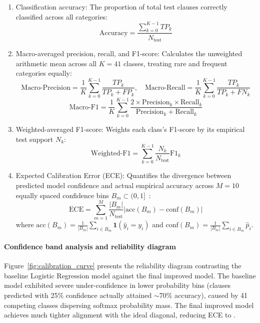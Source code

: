 \begin{enumerate}
    \item Classification accuracy: The proportion of total test clauses correctly classified across all categories:
    \begin{equation}
        \text{Accuracy} = \frac{\sum_{k=0}^{K-1} TP_k}{N_{\text{test}}}
        \label{eq:accuracy}
    \end{equation}
    
    \item Macro-averaged precision, recall, and F1-score: Calculates the unweighted arithmetic mean across all $K = 41$ classes, treating rare and frequent categories equally:
    \begin{equation}
        \text{Macro-Precision} = \frac{1}{K} \sum_{k=0}^{K-1} \frac{TP_k}{TP_k + FP_k}, \quad
        \text{Macro-Recall} = \frac{1}{K} \sum_{k=0}^{K-1} \frac{TP_k}{TP_k + FN_k}
        \label{eq:macro_pr}
    \end{equation}
    \begin{equation}
        \text{Macro-F1} = \frac{1}{K} \sum_{k=0}^{K-1} \frac{2 \times \text{Precision}_k \times \text{Recall}_k}{\text{Precision}_k + \text{Recall}_k}
        \label{eq:macro_f1}
    \end{equation}

    \item Weighted-averaged F1-score: Weights each class's F1-score by its empirical test support $N_k$:
    \begin{equation}
        \text{Weighted-F1} = \sum_{k=0}^{K-1} \frac{N_k}{N_{\text{test}}} \text{F1}_k
        \label{eq:weighted_f1}
    \end{equation}

    \item Expected Calibration Error (ECE): Quantifies the divergence between predicted model confidence and actual empirical accuracy across $M = 10$ equally spaced confidence bins $B_m \subset (0, 1]$~\cite{guo2017calibration}:
    \begin{equation}
        \text{ECE} = \sum_{m=1}^{M} \frac{|B_m|}{N_{\text{test}}} \big|\text{acc}(B_m) - \text{conf}(B_m)\big|
        \label{eq:ece}
    \end{equation}
    where $\text{acc}(B_m) = \frac{1}{|B_m|} \sum_{i \in B_m} \mathbf{1}(\hat{y}_i = y_i)$ and $\text{conf}(B_m) = \frac{1}{|B_m|} \sum_{i \in B_m} \hat{p}_i$.
\end{enumerate}

\paragraph*{Confidence band analysis and reliability diagram}
Figure~\ref{fig:calibration_curve} presents the reliability diagram contrasting the baseline Logistic Regression model against the final improved model. The baseline model exhibited severe under-confidence in lower probability bins (clauses predicted with 25\% confidence actually attained $\sim$70\% accuracy), caused by 41 competing classes dispersing softmax probability mass. The final improved model achieves much tighter alignment with the ideal diagonal, reducing ECE to \FinalSplitAECE{}.

